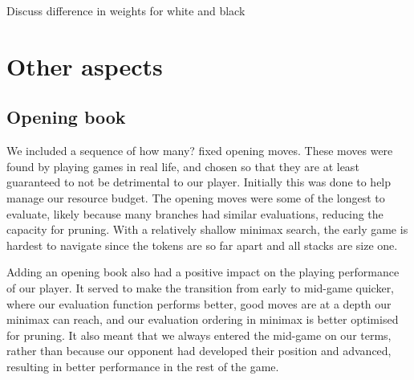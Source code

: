 \documentclass[11pt]{article}
\newcommand{\drafting}[1]{\textcolor{OliveGreen}{#1}}
\begin{document}
\drafting{Discuss difference in weights for white and black}

\section{Other aspects}
\subsection{Opening book} \label{sec:opening-book}
We included a sequence of \drafting{how many?} fixed opening moves. These moves were found by playing games in real life, and chosen so that they are at least guaranteed to not be detrimental to our player. Initially this was done to help manage our resource budget. The opening moves were some of the longest to evaluate, likely because many branches had similar evaluations, reducing the capacity for pruning. With a relatively shallow minimax search, the early game is hardest to navigate since the tokens are so far apart and all stacks are size one.

Adding an opening book also had a positive impact on the playing performance of our player. It served to make the transition from early to mid-game quicker, where our evaluation function performs better, good moves are at a depth our minimax can reach, and our evaluation ordering in minimax is better optimised for pruning. It also meant that we always entered the mid-game on our terms, rather than because our opponent had developed their position and advanced, resulting in better performance in the rest of the game.

\pagebreak
\printbibliography
\end{document}

